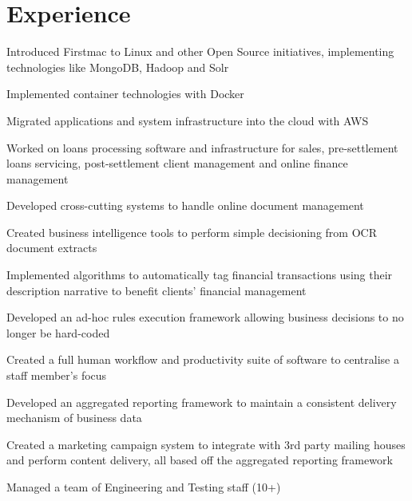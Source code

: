 \documentclass[letterpaper]{deedy-resume} %
\begin{document}
%
\begin{minipage}[t]{0.66\textwidth} %


\section{Experience}


\vspace{\topsep} %
\begin{tightitemize}
\item Introduced Firstmac to Linux and other Open Source initiatives, implementing technologies like MongoDB, Hadoop and Solr
\item Implemented container technologies with Docker
\item Migrated applications and system infrastructure into the cloud with AWS
\item Worked on loans processing software and infrastructure for sales, pre-settlement loans servicing, post-settlement client management and online finance management
\item Developed cross-cutting systems to handle online document management 
\item Created business intelligence tools to perform simple decisioning from OCR document extracts
\item Implemented algorithms to automatically tag financial transactions using their description narrative to benefit clients' financial management
\item Developed an ad-hoc rules execution framework allowing business decisions to no longer be hard-coded
\item Created a full human workflow and productivity suite of software to centralise a staff member's focus 
\item Developed an aggregated reporting framework to maintain a consistent delivery mechanism of business data 
\item Created a marketing campaign system to integrate with 3rd party mailing houses and perform content delivery, all based off the aggregated reporting framework
\item Managed a team of Engineering and Testing staff (10+)
\end{tightitemize}


\end{minipage}
\end{document}
